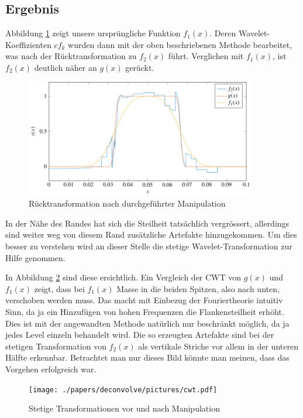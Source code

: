 \subsection{Ergebnis}
Abbildung \ref{deconvolve:result_1d} zeigt unsere ursprüngliche Funktion $f_1(x)$.
Deren Wavelet-Koeffizienten $cf_k$ wurden dann mit der oben beschriebenen Methode bearbeitet, was nach der Rücktransformation zu $f_2(x)$ führt.
Verglichen mit $f_1(x)$, ist $f_2(x)$ deutlich näher an $g(x)$ gerückt.
\begin{figure}
\centering
\includegraphics[width=0.9\textwidth]{./papers/deconvolve/pictures/result_1d.pdf}
\caption{Rücktransformation nach durchgeführter Manipulation\label{deconvolve:result_1d}}
\end{figure}

In der Nähe des Randes hat sich die Steilheit tatsächlich vergrössert, allerdings sind weiter weg von diesem Rand zusätzliche Artefakte hinzugekommen.
Um dies besser zu verstehen wird an dieser Stelle die stetige Wavelet-Transformation zur Hilfe genommen.

In Abbildung \ref{deconvolve:cwt} sind diese ersichtlich.
Ein Vergleich der CWT von $g(x)$ und $f_1(x)$ zeigt, dass bei $f_1(x)$ \glqq Masse\grqq{} in die beiden Spitzen, also nach unten, verschoben werden muss.
Das macht mit Einbezug der Fouriertheorie intuitiv Sinn, da ja ein Hinzufügen von hohen Frequenzen die Flankensteilheit erhöht.
Dies ist mit der angewandten Methode natürlich nur beschränkt möglich, da ja jedes Level einzeln behandelt wird.
Die so erzeugten Artefakte sind bei der stetigen Transformation von $f_2(x)$ als vertikale Striche vor allem in der unteren Hälfte erkennbar.
Betrachtet man nur dieses Bild könnte man meinen, dass das Vorgehen erfolgreich war.

\begin{figure}
\centering
\texttt{[image: ./papers/deconvolve/pictures/cwt.pdf]}
\caption{Stetige Transformationen vor und nach Manipulation\label{deconvolve:cwt}}
\end{figure}

